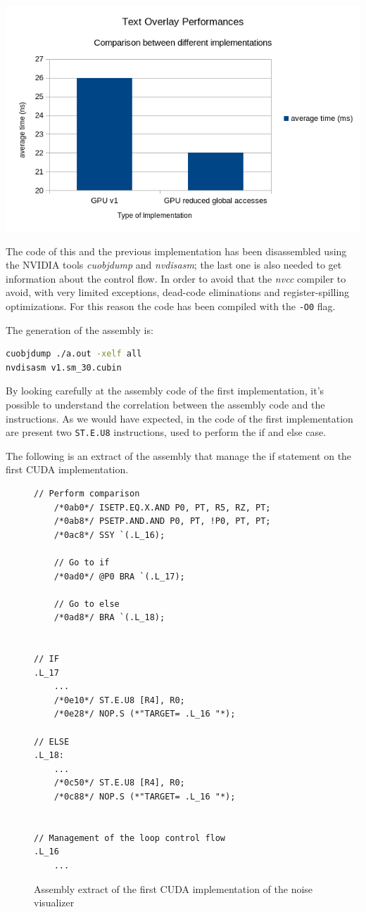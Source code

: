 \documentclass[paper=a4, fontsize=10pt]{scrartcl}	%
\begin{document}
	\begin{center}
		\includegraphics[width=0.6\linewidth]{images/heatmap/comp_heat_6}
	\end{center}


	The code of this and the previous implementation has been disassembled using the NVIDIA tools \textit{cuobjdump} and \textit{nvdisasm}; the last one is also needed to get information about the control flow. In order to avoid that the \textit{nvcc} compiler to avoid, with very limited exceptions, dead-code eliminations and register-spilling optimizations. For this reason the code has been compiled with the \texttt{-O0} flag.

	The generation of the assembly is:
	\begin{lstlisting}[language=bash]
cuobjdump ./a.out -xelf all
nvdisasm v1.sm_30.cubin\end{lstlisting}
	
	By looking carefully at the assembly code of the first implementation, it's possible to understand the correlation between the assembly code and the instructions. As we would have expected, in the code of the first implementation are present two \texttt{ST.E.U8} instructions, used to perform the if and else case.
	
	The following is an extract of the assembly that manage the if statement on the first CUDA implementation.
	\begin{figure}[H]
		\begin{lstlisting}[style=CStyle]
	// Perform comparison
	/*0ab0*/ ISETP.EQ.X.AND P0, PT, R5, RZ, PT;
	/*0ab8*/ PSETP.AND.AND P0, PT, !P0, PT, PT;
	/*0ac8*/ SSY `(.L_16);
	
	// Go to if
	/*0ad0*/ @P0 BRA `(.L_17);
	
	// Go to else
	/*0ad8*/ BRA `(.L_18);


// IF
.L_17
	...
	/*0e10*/ ST.E.U8 [R4], R0;
	/*0e28*/ NOP.S (*"TARGET= .L_16 "*);

// ELSE
.L_18:
	...
	/*0c50*/ ST.E.U8 [R4], R0;
	/*0c88*/ NOP.S (*"TARGET= .L_16 "*);


// Management of the loop control flow	
.L_16
	...\end{lstlisting}
	\caption{Assembly extract of the first CUDA implementation of the noise visualizer}
	\end{figure}
\end{document}
